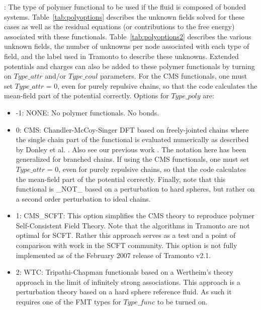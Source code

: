\documentclass[10pt,onecolumn]{article}
\begin{document}
\noindent\dotfill

\vspace{0.1in}
: The type of polymer functional to be used if the fluid is
composed of bonded systems. Table~\ref{tab:polyoptions} describes the unknown
fields solved for these cases as well as the residual equations (or contributions to the free energy) associated with these functionals.  Table~\ref{tab:polyoptions2} describes the various
unknown fields, the number of unknowns per node associated with each type of field, and
the label used in Tramonto to describe these unknowns.  Extended potentials and charges can also be added to these polymer functionals by turning on
$Type\_attr$ and/or $Type\_coul$ parameters.  For the CMS functionals, one must set $Type\_attr$ = 0, even for purely repulsive chains, so that the code calculates the mean-field part of the potential correctly.
Options for $Type\_poly$ are:
\begin{itemize}
\item{-1: NONE: No polymer functionals.  No bonds.}
\item{0: CMS:  Chandler-McCoy-Singer DFT \cite{chandler1,chandler2,chandler3} based
on freely-jointed chains where the single chain part of the functional is evaluated
numerically as described by Donley et al. \cite{donley}. Also see our previous work \cite{frischknecht1}.
The notation here has been generalized for branched chains.  If using the CMS functionals, one must set $Type\_attr$ = 0, even for purely repulsive chains, so that the code calculates the mean-field part of the potential correctly.  Finally, note that this functional is \_NOT\_ based on a perturbation to hard spheres, but rather on a second order perturbation to ideal chains.}
\item{1: CMS\_SCFT:  This option simplifies the CMS theory to reproduce polymer Self-Consistent Field Theory.
Note that the algorithms in Tramonto are not optimal for SCFT.  Rather this approach serves as a test
and a point of comparison with work in the SCFT community.  This option is not fully implemented as
of the February 2007 release of Tramonto v2.1.}
\item{2: WTC:  Tripathi-Chapman functionals \cite{WTC1,WTC2} based on a Wertheim's theory approach in the limit
of infinitely strong associations.  This approach is a perturbation theory based on a hard
sphere reference fluid.  As such it requires one of the FMT types for $Type\_func$ to be turned on.
}
\end{itemize}
\end{document}

